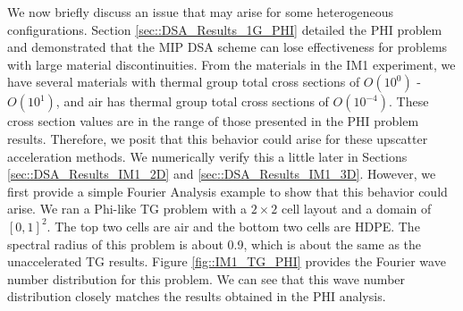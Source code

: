 We now briefly discuss an issue that may arise for some heterogeneous configurations. Section \ref{sec::DSA_Results_1G_PHI} detailed the PHI problem and demonstrated that the MIP DSA scheme can lose effectiveness for problems with large material discontinuities. From the materials in the IM1 experiment, we have several materials with thermal group total cross sections of $O(10^0)$ - $O(10^1)$, and air has thermal group total cross sections of $O(10^{-4})$. These cross section values are in the range of those presented in the PHI problem results. Therefore, we posit that this behavior could arise for these upscatter acceleration methods. We numerically verify this a little later in Sections \ref{sec::DSA_Results_IM1_2D} and \ref{sec::DSA_Results_IM1_3D}. However, we first provide a simple Fourier Analysis example to show that this behavior could arise. We ran a Phi-like TG problem with a $2 \times 2$ cell layout and a domain of $[0,1]^2$. The top two cells are air and the bottom two cells are HDPE. The spectral radius of this problem is about 0.9, which is about the same as the unaccelerated TG results. Figure \ref{fig::IM1_TG_PHI} provides the Fourier wave number distribution for this problem. We can see that this wave number distribution closely matches the results obtained in the PHI analysis.


